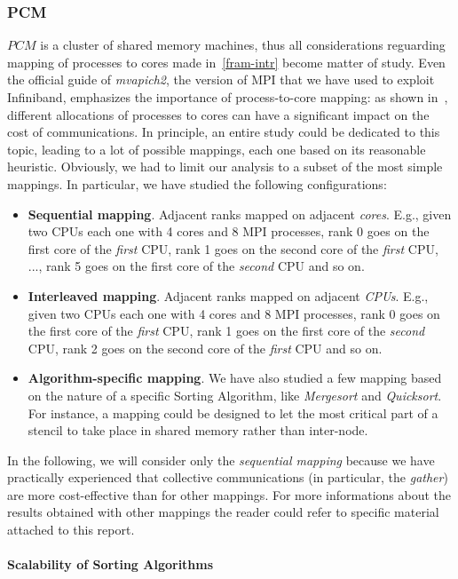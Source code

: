 \subsubsection{PCM}
$PCM$ is a cluster of shared memory machines, thus all considerations reguarding mapping of processes to cores made in~\ref{fram-intr} become matter of study. Even the official guide of \textit{mvapich2}, the version of MPI that we have used to exploit Infiniband, emphasizes the importance of process-to-core mapping: as shown in~\cite{MVAPICH2-MAPPING}, different allocations of processes to cores can have a significant impact on the cost of communications. In principle, an entire study could be dedicated to this topic, leading to a lot of possible mappings, each one based on its reasonable heuristic. Obviously, we had to limit our analysis to a subset of the most simple mappings. In particular, we have studied the following configurations:   
\begin{itemize}
\item \textbf{Sequential mapping}. Adjacent ranks mapped on adjacent \textit{cores}. E.g., given two CPUs each one with 4 cores and 8 MPI processes, rank 0 goes on the first core of the \textit{first} CPU, rank 1 goes on the second core of the \textit{first} CPU, ..., rank 5 goes on the first core of the \textit{second} CPU and so on.
\item \textbf{Interleaved mapping}. Adjacent ranks mapped on adjacent \textit{CPUs}. E.g., given two CPUs each one with 4 cores and 8 MPI processes, rank 0 goes on the first core of the \textit{first} CPU, rank 1 goes on the first core of the \textit{second} CPU, rank 2 goes on the second core of the \textit{first} CPU and so on.
\item \textbf{Algorithm-specific mapping}. We have also studied a few mapping based on the nature of a specific Sorting Algorithm, like \textit{Mergesort} and \textit{Quicksort}. For instance, a mapping could be designed to let the most critical part of a stencil to take place in shared memory rather than inter-node.  
\end{itemize}
In the following, we will consider only the \textit{sequential mapping} because we have practically experienced that collective communications (in particular, the \textit{gather}) are more cost-effective than for other mappings. For more informations about the results obtained with other mappings the reader could refer to specific material attached to this report.


\paragraph{Scalability of Sorting Algorithms}

